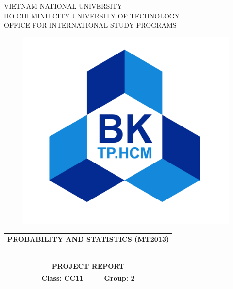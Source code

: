 \documentclass[a4paper]{article}
\begin{document}
\begin{titlepage}
\begin{center}
VIETNAM NATIONAL UNIVERSITY \\
HO CHI MINH CITY UNIVERSITY OF TECHNOLOGY \\
OFFICE FOR INTERNATIONAL STUDY PROGRAMS 
\end{center}

\vspace{1cm}

\begin{figure}[h!]
\begin{center}
\includegraphics[width=0.6\linewidth]{Images/Logo BK.png}
\end{center}
\end{figure}

\vspace{1cm}


\begin{center}
\begin{tabular}{c}
\multicolumn{1}{l}{\textbf{{\Large PROBABILITY AND STATISTICS (MT2013)}}}\\
~~\\
\hline
\\

\textbf{\large PROJECT REPORT} \\
\textbf{\large Class: CC11   ------   Group: 2}\\

\hline
\end{tabular}
\end{center}

\vspace{1.5cm}




\end{titlepage}
\end{document}
